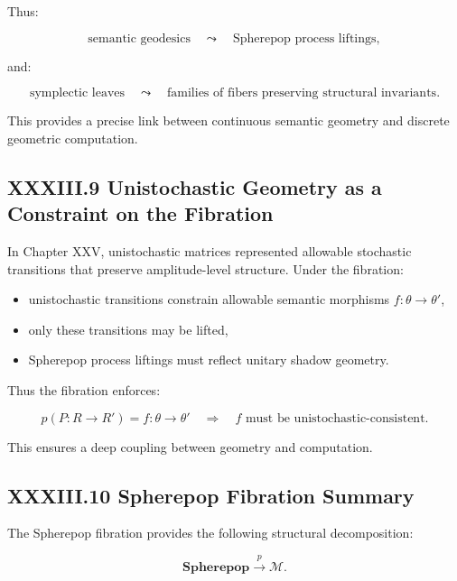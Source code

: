 \documentclass[12pt,letterpaper]{article}
\begin{document}
Thus:

\[
\text{semantic geodesics}
\quad\leadsto\quad
\text{Spherepop process liftings},
\]

and:

\[
\text{symplectic leaves}
\quad\leadsto\quad
\text{families of fibers preserving structural invariants}.
\]

This provides a precise link between continuous semantic geometry and discrete geometric computation.

\subsection{XXXIII.9 Unistochastic Geometry as a Constraint on the Fibration}

In Chapter XXV, unistochastic matrices represented allowable stochastic transitions that preserve amplitude-level structure. Under the fibration:

\begin{itemize}
    \item unistochastic transitions constrain allowable semantic morphisms $f : \theta \to \theta'$,
    \item only these transitions may be lifted,
    \item Spherepop process liftings must reflect unitary shadow geometry.
\end{itemize}

Thus the fibration enforces:

\[
p(P : R \to R') = f : \theta \to \theta'
\quad\Rightarrow\quad
f \text{ must be unistochastic-consistent.}
\]

This ensures a deep coupling between geometry and computation.

\subsection{XXXIII.10 Spherepop Fibration Summary}

The Spherepop fibration provides the following structural decomposition:

\[
\mathbf{Spherepop} \xrightarrow{p} \mathcal{M}.
\]
\end{document}
